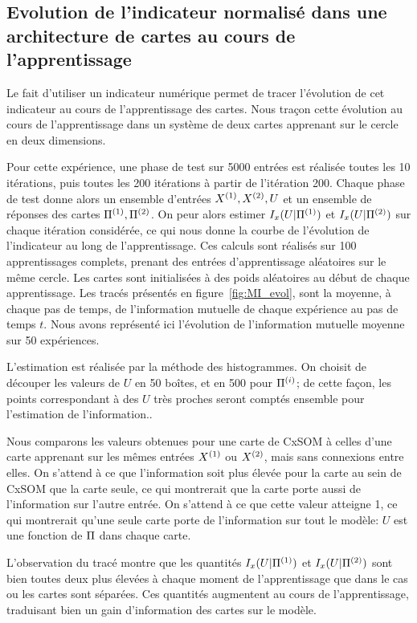 \subsection{Evolution de l'indicateur normalisé dans une architecture de cartes au cours de l'apprentissage}

Le fait d'utiliser un indicateur numérique permet de tracer l'évolution de cet indicateur au cours de l'apprentissage des cartes. Nous traçon cette évolution au cours de l'apprentissage dans un système de deux cartes apprenant sur le cercle en deux dimensions.

Pour cette expérience, une phase de test sur 5000 entrées est réalisée toutes les 10 itérations, puis toutes les 200 itérations à partir de l'itération 200. Chaque phase de test donne alors un ensemble d'entrées $X^{({1})}, X^{({2})}, U$ et un ensemble de réponses des cartes $\Pi^{({1})}, \Pi^{({2})}$. On peur alors estimer $I_x(U|\Pi^{({1})})$ et $I_x(U|\Pi^{({2})})$ sur chaque itération considérée, ce qui nous donne la courbe de l'évolution de l'indicateur au long de l'apprentissage. 
Ces calculs sont réalisés sur 100 apprentissages complets, prenant des entrées d'apprentissage aléatoires sur le même cercle. Les cartes sont initialisées à des poids aléatoires au début de chaque apprentissage. 
Les tracés présentés en figure~\ref{fig:MI_evol}, sont la moyenne, à chaque pas de temps, de l'information mutuelle de chaque expérience au pas de temps $t$. Nous avons représenté ici l'évolution de l'information mutuelle moyenne sur 50 expériences.

L'estimation est réalisée par la méthode des histogrammes. On choisit de découper les valeurs de $U$ en 50 boîtes, et en 500 pour $\Pi^{({i})}$; de cette façon, les points correspondant à des $U$ très proches seront comptés ensemble pour l'estimation de l'information..

Nous comparons les valeurs obtenues pour une carte de CxSOM à celles d'une carte apprenant sur les mêmes entrées $X^{({1})}$ ou $X^{({2})}$, mais sans connexions entre elles. On s'attend à ce que l'information soit plus élevée pour la carte au sein de CxSOM que la carte seule, ce qui montrerait que la carte porte aussi de l'information sur l'autre entrée. On s'attend à ce que cette valeur atteigne 1, ce qui montrerait qu'une seule carte porte de l'information sur tout le modèle: $U$ est une fonction de $\Pi$ dans chaque carte.

L'observation du tracé montre que les quantités $I_x(U|\Pi^{({1})})$ et $I_x(U|\Pi^{({2})})$ sont bien toutes deux plus élevées à chaque moment de l'apprentissage que dans le cas ou les cartes sont séparées. Ces quantités augmentent au cours de l'apprentissage, traduisant bien un gain d'information des cartes sur le modèle.

